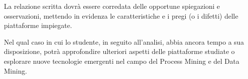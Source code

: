 La relazione scritta dovrà essere corredata delle opportune spiegazioni e osservazioni, mettendo in evidenza le caratteristiche e i pregi (o i difetti) delle piattaforme impiegate.

Nel qual caso in cui lo studente, in seguito all'analisi, abbia ancora tempo a sua disposizione, potrà approfondire ulteriori aspetti delle piattaforme studiate o esplorare nuove tecnologie emergenti nel campo del Process Mining e del Data Mining.